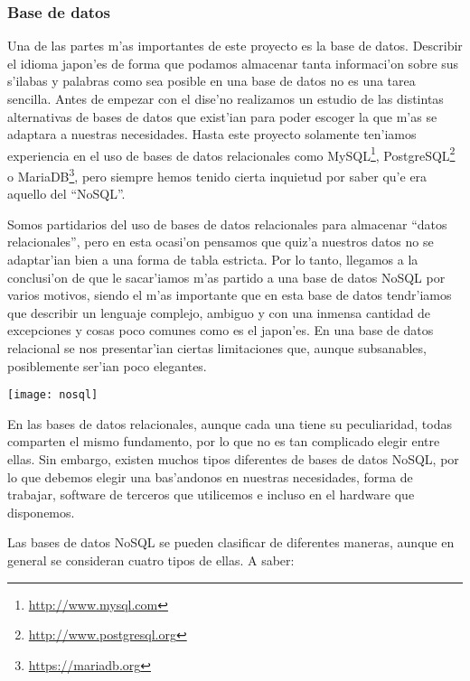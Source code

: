 \subsubsection{Base de datos}
\label{sub:base_de_datos}
Una de las partes m'as importantes de este proyecto es la base de datos. Describir el idioma
japon'es de forma que podamos almacenar tanta informaci'on sobre sus s'ilabas y palabras
como sea posible en una base de datos no es una tarea sencilla. Antes de empezar con el dise'no
realizamos un estudio de las distintas alternativas de bases de datos que exist'ian para poder
escoger la que m'as se adaptara a nuestras necesidades. Hasta este proyecto solamente ten'iamos
experiencia en el uso de bases de datos relacionales como MySQL\footnote{\url{http://www.mysql.com}}, PostgreSQL\footnote{\url{http://www.postgresql.org}} o MariaDB\footnote{\url{https://mariadb.org}}, pero
siempre hemos tenido cierta inquietud por saber qu'e era aquello del ``NoSQL''.

Somos partidarios del uso de bases de datos relacionales
para almacenar ``datos relacionales'', pero en esta ocasi'on pensamos que quiz'a nuestros
datos no se adaptar'ian bien a una forma de tabla estricta. Por lo tanto, llegamos a la
conclusi'on de que le sacar'iamos m'as partido a una base de datos NoSQL por varios motivos,
siendo el m'as importante que en esta base de datos tendr'iamos que describir un lenguaje
complejo, ambiguo y con una inmensa cantidad de excepciones y cosas poco comunes como es
el japon'es. En una base de datos relacional se nos presentar'ian ciertas limitaciones que,
aunque subsanables, posiblemente ser'ian poco elegantes.

\vspace{2em}
\begin{center}
\texttt{[image: nosql]}
\end{center}

En las bases de datos relacionales, aunque cada una tiene su peculiaridad, todas comparten
el mismo fundamento, por lo que no es tan complicado elegir entre ellas. Sin embargo, existen
muchos tipos diferentes de bases de datos NoSQL, por lo que debemos elegir una
bas'andonos en nuestras necesidades, forma de trabajar, software de terceros que utilicemos e
incluso en el hardware que disponemos.

Las bases de datos NoSQL se pueden clasificar de diferentes maneras, aunque en general se consideran
cuatro tipos de ellas. A saber:

